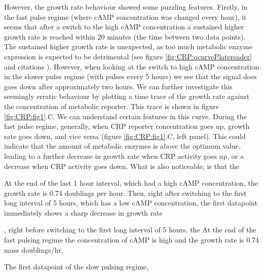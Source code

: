 However, the growth rate behaviour showed some puzzling features. 
%
Firstly, in the fast pulse regime (where cAMP concentration was changed every hour), it seems that after a switch to the high cAMP concentration 
a sustained higher growth rate is reached within 20 minutes (the time between two data points).
%
The sustained higher growth rate is unexpected, as too much metabolic enzyme expression is expected to 
be detrimental (see figure \ref{fig:CRP:ocurvePlatereader} and citations \cite{Towbin2017, Ray2016}).
%
However, when looking at the switch to high cAMP concentration in the slower pulse regime (with pulses every 5 hours) 
we see that the signal does goes down after approximately two hours. 
%
We can further investigate this seemingly erratic behaviour by plotting a time trace of the growth rate against the concentration of metabolic reporter.
%
This trace is shown in figure \ref{fig:CRP:fig1}.C. 
%
We can understand certain features in this curve.
%
During the fast pulse regime, generally, when CRP reporter concentration goes up, growth rate goes down, and vice versa (figure \ref{fig:CRP:fig1}.C, left panel).
This could indicate that the amount of metabolic enzymes is above the optimum value, 
leading to a further decrease in growth rate when CRP activity goes up,
or a decrease when CRP activity goes down.
%
What is also noticeable, is that the 


At the end of the last 1 hour interval, which had a high cAMP concentration,
the growth rate is 0.74 doublings per hour.
%
Then, right after switching to the first long interval of 5 hours, which has a low cAMP concentration,
the first datapoint immediately shows a sharp decrease in growth rate

, right before switching to the first long interval of 5 hours, the 
At the end of the fast pulsing regime the concentration of cAMP is high and the growth rate is 0.74 mass doublings/hr,




The first datapoint of the slow pulsing regime,

